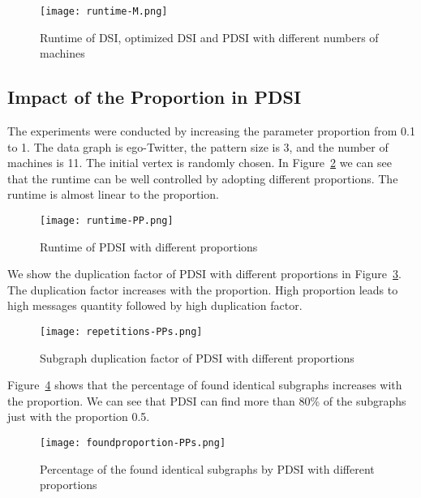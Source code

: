 \begin{figure}[H]
  \begin{center}
    \texttt{[image: runtime-M.png]}
    \caption{Runtime of DSI, optimized DSI and PDSI with different numbers of machines}
    \label{fig:runtime-M}
  \end{center}
\end{figure}

\subsection{Impact of the Proportion in PDSI}

The experiments were conducted by increasing the parameter proportion from 0.1 to 1. The data graph is ego-Twitter, the pattern size is 3, and the number of machines is 11. The initial vertex is randomly chosen. In Figure~\ref{fig:runtime-PP} we can see that the runtime can be well controlled by adopting different proportions. The runtime is almost linear to the proportion.

\begin{figure}[H]
  \begin{center}
    \texttt{[image: runtime-PP.png]}
    \caption{Runtime of PDSI with different proportions}
    \label{fig:runtime-PP}
  \end{center}
\end{figure}

We show the duplication factor of PDSI with different proportions in Figure~\ref{fig:repetitions-PP}. The duplication factor increases with the proportion. High proportion leads to high messages quantity followed by high duplication factor.

\begin{figure}[H]
  \begin{center}
    \texttt{[image: repetitions-PPs.png]}
    \caption{Subgraph duplication factor of PDSI with different proportions}
    \label{fig:repetitions-PP}
  \end{center}
\end{figure}

Figure~\ref{fig:foundproportion-PP} shows that the percentage of found identical subgraphs increases with the proportion. We can see that PDSI can find more than 80\% of the subgraphs just with the proportion 0.5.

\begin{figure}[H]
  \begin{center}
    \texttt{[image: foundproportion-PPs.png]}
    \caption{Percentage of the found identical subgraphs by PDSI with different proportions}
    \label{fig:foundproportion-PP}
  \end{center}
\end{figure}

